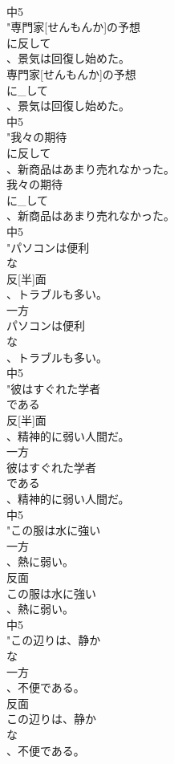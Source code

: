 \documentclass[8pt]{extreport}
\begin{document}
\begin{CJK}{UTF8}{min}
\\	中5
\\	"専門家[せんもんか]の予想
\\	に反して
\\	、景気は回復し始めた。
\\	専門家[せんもんか]の予想
\\	に_して
\\	、景気は回復し始めた。
\\	中5
\\	"我々の期待
\\	に反して
\\	、新商品はあまり売れなかった。
\\	我々の期待
\\	に_して
\\	、新商品はあまり売れなかった。
\\	中5
\\	"パソコンは便利
\\	な
\\	反[半]面
\\	、トラブルも多い。
\\	一方
\\	パソコンは便利
\\	な
\\	、トラブルも多い。
\\	中5
\\	"彼はすぐれた学者
\\	である
\\	反[半]面
\\	、精神的に弱い人間だ。
\\	一方
\\	彼はすぐれた学者
\\	である
\\	、精神的に弱い人間だ。
\\	中5
\\	"この服は水に強い
\\	一方
\\	、熱に弱い。
\\	反面
\\	この服は水に強い
\\	、熱に弱い。
\\	中5
\\	"この辺りは、静か
\\	な
\\	一方
\\	、不便である。
\\	反面
\\	この辺りは、静か
\\	な
\\	、不便である。

\end{CJK}
\end{document}
